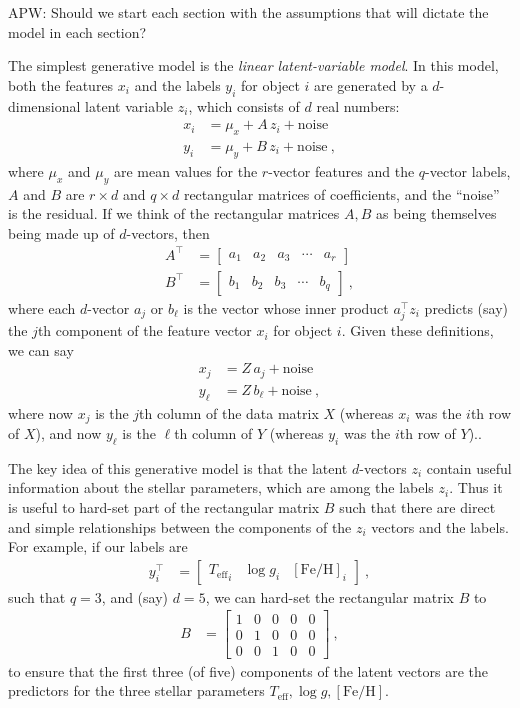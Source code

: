 \documentclass[modern]{aastex631}
\newcommand{\teff}{{T_{\mathrm{eff}}}}
\newcommand{\logg}{\log g}
\newcommand{\feh}{[\mathrm{Fe}/\mathrm{H}]}
\begin{document}
APW: Should we start each section with the assumptions that will dictate the model in each section?

The simplest generative model is the \emph{linear latent-variable model}.
In this model, both the features $x_i$ and the labels $y_i$ for object $i$ are generated by a $d$-dimensional latent variable $z_i$, which consists of $d$ real numbers:
\begin{align}
  x_i &= \mu_x + A\,z_i + \mbox{noise} \\
  y_i &= \mu_y + B\,z_i + \mbox{noise} ~,
\end{align}
where $\mu_x$ and $\mu_y$ are mean values for the $r$-vector features and the $q$-vector labels,
$A$ and $B$ are $r\times d$ and $q\times d$ rectangular matrices of coefficients,
and the ``noise'' is the residual.
If we think of the rectangular matrices $A, B$ as being themselves being made up of $d$-vectors, then
\begin{align}
  A^\top &= \begin{bmatrix}a_1 & a_2 & a_3 & \cdots & a_r\end{bmatrix} \\
  B^\top &= \begin{bmatrix}b_1 & b_2 & b_3 & \cdots & b_q\end{bmatrix} ~,
\end{align}
where each $d$-vector $a_j$ or $b_\ell$ is the vector whose inner product $a_j^\top z_i$ predicts (say) the $j$th component of the feature vector $x_i$ for object $i$.
Given these definitions, we can say
\begin{align}
  x_j &= Z\,a_j + \mbox{noise} \\
  y_\ell &= Z\,b_\ell + \mbox{noise} ~,
\end{align}
where now $x_j$ is the $j$th column of the data matrix $X$ (whereas $x_i$ was the $i$th row of $X$),
and now $y_\ell$ is the $\ell$th column of $Y$ (whereas $y_i$ was the $i$th row of $Y$)..

The key idea of this generative model is that the latent $d$-vectors $z_i$ contain useful information about the stellar parameters, which are among the labels $z_i$.
Thus it is useful to hard-set part of the rectangular matrix $B$ such that there are direct and simple relationships between the components of the $z_i$ vectors and the labels.
For example, if our labels are
\begin{align}
  y_i^\top &= \begin{bmatrix}\teff_i & \logg_i & \feh_i\end{bmatrix} ~,
\end{align}
such that $q=3$, and (say) $d=5$, we can hard-set the rectangular matrix $B$ to
\begin{align}
  B &= \begin{bmatrix}
    1 & 0 & 0 & 0 & 0 \\
    0 & 1 & 0 & 0 & 0 \\
    0 & 0 & 1 & 0 & 0
    \end{bmatrix} ~,
\end{align}
to ensure that the first three (of five) components of the latent vectors are the predictors for the three stellar parameters $\teff, \logg, \feh$.
\end{document}
